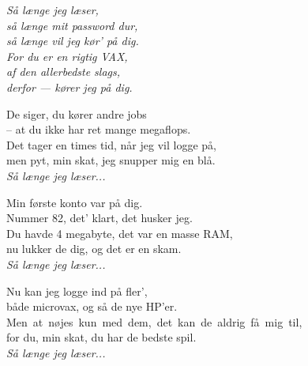 \begin{flushleft}
\emph{Så længe jeg læser,\\
så længe mit password dur,\\
så længe vil jeg kør' på dig.\\
For du er en rigtig VAX,\\
af den allerbedste slags,\\
derfor --- kører jeg på dig.\\[5mm]
}

De siger, du kører andre jobs\\
-- at du ikke har ret mange megaflops.\\
Det tager en times tid, når jeg vil logge på,\\
men pyt, min skat, jeg snupper mig en blå.\\[5mm]

\emph{Så længe jeg læser...\\[5mm]
}

Min første konto var på dig.\\
Nummer 82, det' klart, det husker jeg.\\
Du havde 4 megabyte, det var en masse RAM,\\
nu lukker de dig, og det er en skam.\\[5mm]

\emph{Så længe jeg læser...\\[5mm]
}

Nu kan jeg logge ind på fler',\\
både microvax, og så de nye HP'er.\\
\mbox{Men at nøjes kun med dem, det kan de aldrig få mig til,}\\
for du, min skat, du har de bedste spil.\\[5mm]

\emph{Så længe jeg læser...\\[5mm]
}
\end{flushleft}
\vfill

